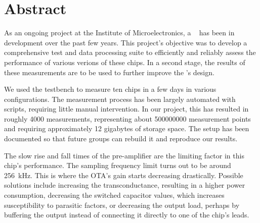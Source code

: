 \chapter*{Abstract}
\label{ch:abstract}

As an ongoing  project at the Institute of Microelectronics,  a \sdm~ has been
in development over the past few years. This project's objective was to develop
a comprehensive  test and  data processing suite  to efficiently  and reliably
assess the performance  of various verions of these chips. In  a second stage,
the results of these measurements are to be used to further improve the \sdm's
design.

We  used the testbench  to  measure  ten  chips  in  a  few  days  in  various
configurations. The  measurement  process  has  been  largely  automated  with
scripts,  requiring  little manual intervention.  In  our  project,  this  has
resulted   in   roughly   \num{4000}    measurements,    representing    about
\num{500000000}   measurement  points  and  requiring  approximately  \num{12}
gigabytes  of  storage  space.  The setup has been documented so  that  future
groups can rebuild it and reproduce our results.

The slow rise and fall times  of  the pre-amplifier are the limiting factor in
this  chip's  performance. The sampling frequency limit turns out to be around
\SI{256}{\kilo\hertz}.  This  is   where  the  OTA's  gain  starts  decreasing
drastically.  Possible  solutions  include  increasing  the  transconductance,
resulting in  a  higher  power  consumption, decreasing the switched capacitor
values, which increases susceptibility to parasitic factors, or decreasing the
output load, perhaps by buffering the output instead of connecting it directly
to one of the chip's leads.


